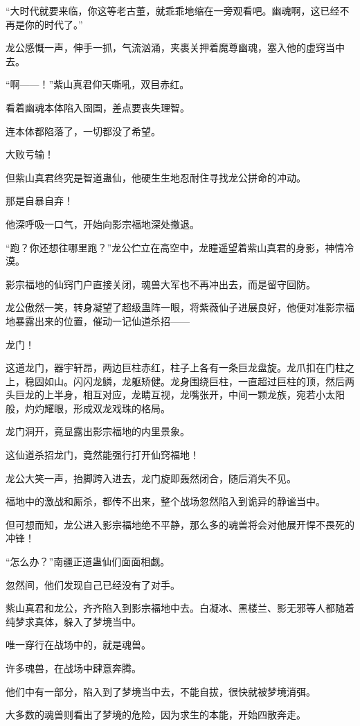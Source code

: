 \begin{this_body}
“大时代就要来临，你这等老古董，就乖乖地缩在一旁观看吧。幽魂啊，这已经不再是你的时代了。”

龙公感慨一声，伸手一抓，气流汹涌，夹裹关押着魔尊幽魂，塞入他的虚窍当中去。

“啊——！”紫山真君仰天嘶吼，双目赤红。

看着幽魂本体陷入囹圄，差点要丧失理智。

连本体都陷落了，一切都没了希望。

大败亏输！

但紫山真君终究是智道蛊仙，他硬生生地忍耐住寻找龙公拼命的冲动。

那是自暴自弃！

他深呼吸一口气，开始向影宗福地深处撤退。

“跑？你还想往哪里跑？”龙公伫立在高空中，龙瞳遥望着紫山真君的身影，神情冷漠。

影宗福地的仙窍门户直接关闭，魂兽大军也不再冲出去，而是留守回防。

龙公傲然一笑，转身凝望了超级蛊阵一眼，将紫薇仙子进展良好，他便对准影宗福地暴露出来的位置，催动一记仙道杀招——

龙门！

这道龙门，器宇轩昂，两边巨柱赤红，柱子上各有一条巨龙盘旋。龙爪扣在门柱之上，稳固如山。闪闪龙鳞，龙躯矫健。龙身围绕巨柱，一直超过巨柱的顶，然后两头巨龙的上半身，相互对应，龙睛互视，龙嘴张开，中间一颗龙族，宛若小太阳般，灼灼耀眼，形成双龙戏珠的格局。

龙门洞开，竟显露出影宗福地的内里景象。

这仙道杀招龙门，竟然能强行打开仙窍福地！

龙公大笑一声，抬脚跨入进去，龙门旋即轰然闭合，随后消失不见。

福地中的激战和厮杀，都传不出来，整个战场忽然陷入到诡异的静谧当中。

但可想而知，龙公进入影宗福地绝不平静，那么多的魂兽将会对他展开悍不畏死的冲锋！

“怎么办？”南疆正道蛊仙们面面相觑。

忽然间，他们发现自己已经没有了对手。

紫山真君和龙公，齐齐陷入到影宗福地中去。白凝冰、黑楼兰、影无邪等人都随着纯梦求真体，躲入了梦境当中。

唯一穿行在战场中的，就是魂兽。

许多魂兽，在战场中肆意奔腾。

他们中有一部分，陷入到了梦境当中去，不能自拔，很快就被梦境消弭。

大多数的魂兽则看出了梦境的危险，因为求生的本能，开始四散奔走。


\end{this_body}
